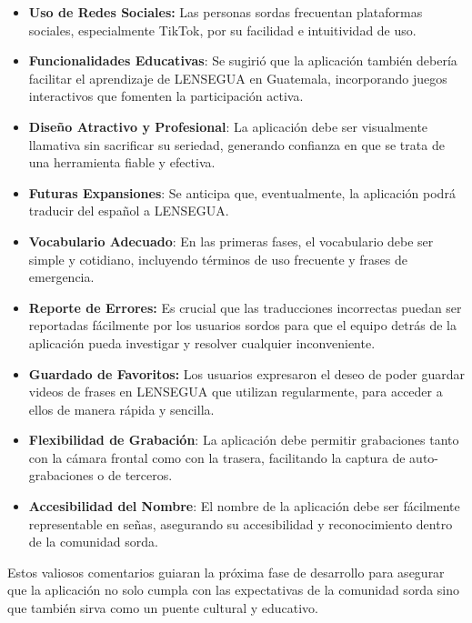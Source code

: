 \begin{itemize}
    \item \textbf{Uso de Redes Sociales:} Las personas sordas frecuentan plataformas sociales, especialmente TikTok, por su facilidad e intuitividad de uso.
    
    \item \textbf{Funcionalidades Educativas}: Se sugirió que la aplicación también debería facilitar el aprendizaje de LENSEGUA en Guatemala, incorporando juegos interactivos que fomenten la participación activa.
    
    \item \textbf{Diseño Atractivo y Profesional}: La aplicación debe ser visualmente llamativa sin sacrificar su seriedad, generando confianza en que se trata de una herramienta fiable y efectiva.
    
    \item \textbf{Futuras Expansiones}: Se anticipa que, eventualmente, la aplicación podrá traducir del español a LENSEGUA.
    
    \item \textbf{Vocabulario Adecuado}: En las primeras fases, el vocabulario debe ser simple y cotidiano, incluyendo términos de uso frecuente y frases de emergencia.
    
    \item \textbf{Reporte de Errores:} Es crucial que las traducciones incorrectas puedan ser reportadas fácilmente por los usuarios sordos para que el equipo detrás de la aplicación pueda investigar y resolver cualquier inconveniente.
    
    \item \textbf{Guardado de Favoritos:} Los usuarios expresaron el deseo de poder guardar videos de frases en LENSEGUA que utilizan regularmente, para acceder a ellos de manera rápida y sencilla.
    
    \item \textbf{Flexibilidad de Grabación}: La aplicación debe permitir grabaciones tanto con la cámara frontal como con la trasera, facilitando la captura de auto-grabaciones o de terceros.
    
    \item \textbf{Accesibilidad del Nombre}: El nombre de la aplicación debe ser fácilmente representable en señas, asegurando su accesibilidad y reconocimiento dentro de la comunidad sorda.
    
\end{itemize}

Estos valiosos comentarios guiaran la próxima fase de desarrollo para asegurar que la aplicación no solo cumpla con las expectativas de la comunidad sorda sino que también sirva como un puente cultural y educativo.


